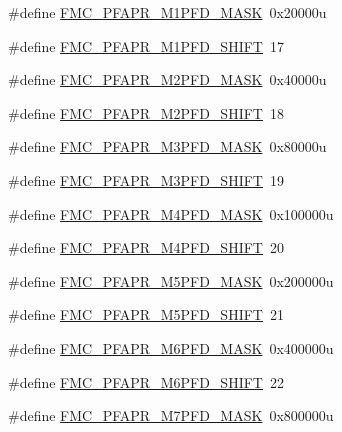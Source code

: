 \begin{DoxyCompactItemize}
\item 
\#define \hyperlink{group___f_m_c___register___masks_ga3288aee0551874c34ce18211489a5f74}{F\+M\+C\+\_\+\+P\+F\+A\+P\+R\+\_\+\+M1\+P\+F\+D\+\_\+\+M\+A\+SK}~0x20000u
\item 
\#define \hyperlink{group___f_m_c___register___masks_gaf51c3aa2255cc9c8efe5c2a705593f8f}{F\+M\+C\+\_\+\+P\+F\+A\+P\+R\+\_\+\+M1\+P\+F\+D\+\_\+\+S\+H\+I\+FT}~17
\item 
\#define \hyperlink{group___f_m_c___register___masks_ga25320b4377f5b7137bece86c278122a4}{F\+M\+C\+\_\+\+P\+F\+A\+P\+R\+\_\+\+M2\+P\+F\+D\+\_\+\+M\+A\+SK}~0x40000u
\item 
\#define \hyperlink{group___f_m_c___register___masks_ga52792f2b60fa3fef0d38b172867adfe9}{F\+M\+C\+\_\+\+P\+F\+A\+P\+R\+\_\+\+M2\+P\+F\+D\+\_\+\+S\+H\+I\+FT}~18
\item 
\#define \hyperlink{group___f_m_c___register___masks_ga7ec6298e08ea7c43a5233d895ebb3c06}{F\+M\+C\+\_\+\+P\+F\+A\+P\+R\+\_\+\+M3\+P\+F\+D\+\_\+\+M\+A\+SK}~0x80000u
\item 
\#define \hyperlink{group___f_m_c___register___masks_ga0de5ac6c72c9bc67057f028f4a946539}{F\+M\+C\+\_\+\+P\+F\+A\+P\+R\+\_\+\+M3\+P\+F\+D\+\_\+\+S\+H\+I\+FT}~19
\item 
\#define \hyperlink{group___f_m_c___register___masks_gaa1b82d16461f952ac2b92896f79059a3}{F\+M\+C\+\_\+\+P\+F\+A\+P\+R\+\_\+\+M4\+P\+F\+D\+\_\+\+M\+A\+SK}~0x100000u
\item 
\#define \hyperlink{group___f_m_c___register___masks_gaf06886cc4a8e2d455cef47f111ac8a4b}{F\+M\+C\+\_\+\+P\+F\+A\+P\+R\+\_\+\+M4\+P\+F\+D\+\_\+\+S\+H\+I\+FT}~20
\item 
\#define \hyperlink{group___f_m_c___register___masks_ga4ac647b6c05fcd080c70febe293bd169}{F\+M\+C\+\_\+\+P\+F\+A\+P\+R\+\_\+\+M5\+P\+F\+D\+\_\+\+M\+A\+SK}~0x200000u
\item 
\#define \hyperlink{group___f_m_c___register___masks_ga1efe3150392c8b3b9e4f42ec43bfef39}{F\+M\+C\+\_\+\+P\+F\+A\+P\+R\+\_\+\+M5\+P\+F\+D\+\_\+\+S\+H\+I\+FT}~21
\item 
\#define \hyperlink{group___f_m_c___register___masks_ga6d5a68ef8363082c0c7077c380e7aad6}{F\+M\+C\+\_\+\+P\+F\+A\+P\+R\+\_\+\+M6\+P\+F\+D\+\_\+\+M\+A\+SK}~0x400000u
\item 
\#define \hyperlink{group___f_m_c___register___masks_ga5ff1d949214bab253e7b426ca8fb6884}{F\+M\+C\+\_\+\+P\+F\+A\+P\+R\+\_\+\+M6\+P\+F\+D\+\_\+\+S\+H\+I\+FT}~22
\item 
\#define \hyperlink{group___f_m_c___register___masks_gac0652379651a8388e65f2e96358b72f1}{F\+M\+C\+\_\+\+P\+F\+A\+P\+R\+\_\+\+M7\+P\+F\+D\+\_\+\+M\+A\+SK}~0x800000u

\end{DoxyCompactItemize}
